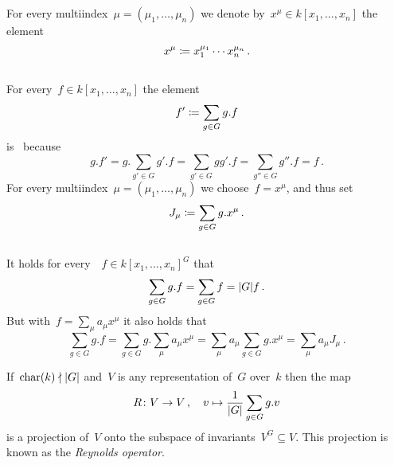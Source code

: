 \section{}

For every multiindex~$\mu = (\mu_1, \dotsc, \mu_n)$ we denote by~$x^\mu \in k[x_1, \dotsc, x_n]$ the element
\[
            x^\mu
  \coloneqq  x_1^{\mu_1} \dotsm x_n^{\mu_n} \,.
\]





\subsection{}

For every~$f \in k[x_1, \dotsc, x_n]$ the element
\[
            f'
  \coloneqq  \sum_{g \in G} g.f
\]
is~ because
\[
    g.f'
  = g.\sum_{g' \in G} g'.f
  = \sum_{g' \in G} g g'.f
  = \sum_{g'' \in G} g''.f
  = f \,.
\]
For every multiindex~$\mu = (\mu_1, \dotsc, \mu_n)$ we choose~$f = x^\mu$, and thus set
\[
            J_\mu
  \coloneqq  \sum_{g \in G} g.x^\mu  \,.
\]





\subsection{}

It holds for every~~$f \in k[x_1, \dotsc, x_n]^G$ that
\[
    \sum_{g \in G} g.f
  = \sum_{g \in G} f
  = \lvert G\rvert f \,.
\]
But with~$f = \sum_{\mu} a_\mu x^\mu$ it also holds that
\[
    \sum_{g \in G} g.f
  = \sum_{g \in G} g.\sum_{\mu} a_\mu x^\mu
  = \sum_{\mu} a_\mu \sum_{g \in G} g.x^\mu
  = \sum_{\mu} a_\mu J_\mu \,.
\]

\begin{remark}
  If~$\operatorname{char}(k) \nmid \lvert G\rvert$ and~$V$ is any representation of~$G$ over~$k$ then the map
  \[
            R
    \colon  V
    \to     V \,,
    \quad   v
    \mapsto \frac{1}{\lvert G\rvert} \sum_{g \in G} g.v
  \]
  is a projection of~$V$ onto the subspace of invariants~$V^G \subseteq V$.
  This projection is known as the \emph{Reynolds operator}.
\end{remark}





\subsection{}

